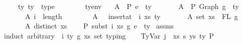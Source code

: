 \begin{isabellebody}
\ \ \ \ \ ty{}\ ty{}\ {\isacharcolon}{\kern0pt}{\isacharcolon}{\kern0pt}\ type\isanewline
\ \ \ \ \ {\isasymGamma}{}\ {\isasymGamma}{}\ {\isacharcolon}{\kern0pt}{\isacharcolon}{\kern0pt}\ tyenv\isanewline
\ \ \ A{}{\isacharcolon}{\kern0pt}\ {\isachardoublequoteopen}{\isasymGamma}{}\ {\isasymturnstile}{\isacharbraceleft}{\kern0pt}P{\isacharbraceright}{\kern0pt}\ e{}\ {\isacharcolon}{\kern0pt}\ ty{}{\isachardoublequoteclose}\isanewline
\ \ \ \ \ \ \ A{}{\isacharcolon}{\kern0pt}\ {\isachardoublequoteopen}{\isasymGamma}{}\ {\isasymturnstile}{\isacharbraceleft}{\kern0pt}P{\isacharbraceright}{\kern0pt}\ Graph\ g{}\ {\isacharcolon}{\kern0pt}\ ty{}{\isachardoublequoteclose}\isanewline
\ \ \ \ \ \ \ A{}{\isacharcolon}{\kern0pt}\ {\isachardoublequoteopen}i\ {\isasymle}\ length\ {\isasymGamma}{}{\isachardoublequoteclose}\isanewline
\ \ \ \ \ \ \ A{}{\isacharcolon}{\kern0pt}\ {\isachardoublequoteopen}{\isasymGamma}{}\ {\isacharequal}{\kern0pt}\ insert{\isacharunderscore}{\kern0pt}at\ {\isasymGamma}{}\ i\ {\isacharparenleft}{\kern0pt}xs{\isacharcomma}{\kern0pt}\ ty{}{\isacharparenright}{\kern0pt}{\isachardoublequoteclose}\isanewline
\ \ \ \ \ \ \ A{}{\isacharcolon}{\kern0pt}\ {\isachardoublequoteopen}set\ xs\ {\isacharequal}{\kern0pt}\ FL\ g{}{\isachardoublequoteclose}\isanewline
\ \ \ \ \ \ \ A{}{\isacharcolon}{\kern0pt}\ {\isachardoublequoteopen}distinct\ xs{\isachardoublequoteclose}\isanewline
\ \ \ {\isachardoublequoteopen}{\isasymGamma}{}\ {\isasymturnstile}{\isacharbraceleft}{\kern0pt}P{\isacharbraceright}{\kern0pt}\ subst\ i\ xs\ g{}\ e{}\ {\isacharcolon}{\kern0pt}\ ty{}{\isachardoublequoteclose}\isanewline
%
\isadelimproof
%
\endisadelimproof
%
\isatagproof
{}\isamarkupfalse%
\ assms\isanewline
{}\isamarkupfalse%
\ {\isacharparenleft}{\kern0pt}induct\ arbitrary{\isacharcolon}{\kern0pt}\ {\isasymGamma}{}\ i\ ty{}\ g{}\ xs\ set{\isacharcolon}{\kern0pt}\ typing{\isacharparenright}{\kern0pt}\isanewline
\ \ \isamarkupfalse%
\ {\isacharparenleft}{\kern0pt}TyVar\ j\ {\isasymGamma}\ xs{\isacharprime}{\kern0pt}\ s\ ys\ ty{\isacharprime}{\kern0pt}\ P{\isacharparenright}{\kern0pt}\isanewline

\end{isabellebody}
